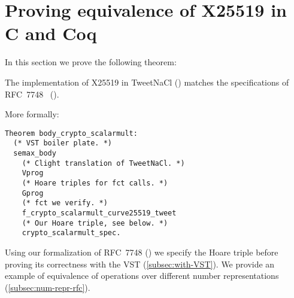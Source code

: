 \section{Proving equivalence of X25519 in C and Coq}
\label{sec:C-Coq}

In this section we prove the following theorem:

\begin{informaltheorem}
The implementation of X25519 in TweetNaCl () matches
the specifications of RFC~7748~\cite{rfc7748} ().
\end{informaltheorem}

More formally:
\begin{lstlisting}[language=Coq]
Theorem body_crypto_scalarmult:
  (* VST boiler plate. *)
  semax_body
    (* Clight translation of TweetNaCl. *)
    Vprog
    (* Hoare triples for fct calls. *)
    Gprog
    (* fct we verify. *)
    f_crypto_scalarmult_curve25519_tweet
    (* Our Hoare triple, see below. *)
    crypto_scalarmult_spec.
\end{lstlisting}

Using our formalization of RFC~7748 () we specify the Hoare
triple before proving its correctness with the VST (\ref{subsec:with-VST}).
We provide an example of equivalence of operations over different number
representations (\ref{subsec:num-repr-rfc}).

